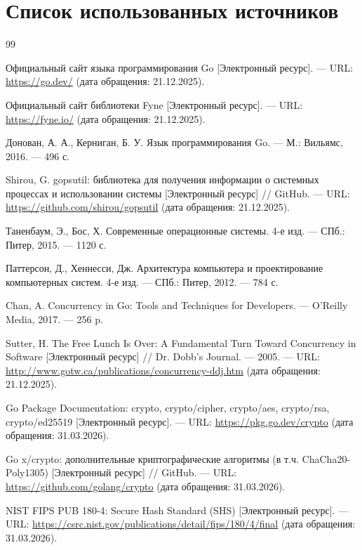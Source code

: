 \chapter*{Список использованных источников}
\begin{thebibliography}{99}

\sloppy

Официальный сайт языка программирования Go [Электронный ресурс]. — URL: \url{https://go.dev/} (дата обращения: 21.12.2025).

Официальный сайт библиотеки Fyne [Электронный ресурс]. — URL: \url{https://fyne.io/} (дата обращения: 21.12.2025).

Донован, А. А., Керниган, Б. У. Язык программирования Go. — М.: Вильямс, 2016. — 496 с.

Shirou, G. gopsutil: библиотека для получения информации о системных процессах и использовании системы [Электронный ресурс] // GitHub. — URL: \url{https://github.com/shirou/gopsutil} (дата обращения: 21.12.2025).

Таненбаум, Э., Бос, Х. Современные операционные системы. 4-е изд. — СПб.: Питер, 2015. — 1120 с.

Паттерсон, Д., Хеннесси, Дж. Архитектура компьютера и проектирование компьютерных систем. 4-е изд. — СПб.: Питер, 2012. — 784 с.

Chan, A. Concurrency in Go: Tools and Techniques for Developers. — O'Reilly Media, 2017. — 256 p.

Sutter, H. The Free Lunch Is Over: A Fundamental Turn Toward Concurrency in Software [Электронный ресурс] // Dr. Dobb's Journal. — 2005. — URL: \url{http://www.gotw.ca/publications/concurrency-ddj.htm} (дата обращения: 21.12.2025).

Go Package Documentation: crypto, crypto/cipher, crypto/aes, crypto/rsa, crypto/ed25519 [Электронный ресурс]. — URL: \url{https://pkg.go.dev/crypto} (дата обращения: 31.03.2026).

Go x/crypto: дополнительные криптографические алгоритмы (в т.ч. ChaCha20-Poly1305) [Электронный ресурс] // GitHub. — URL: \url{https://github.com/golang/crypto} (дата обращения: 31.03.2026).

NIST FIPS PUB 180-4: Secure Hash Standard (SHS) [Электронный ресурс]. — URL: \url{https://csrc.nist.gov/publications/detail/fips/180/4/final} (дата обращения: 31.03.2026).


\end{thebibliography}
